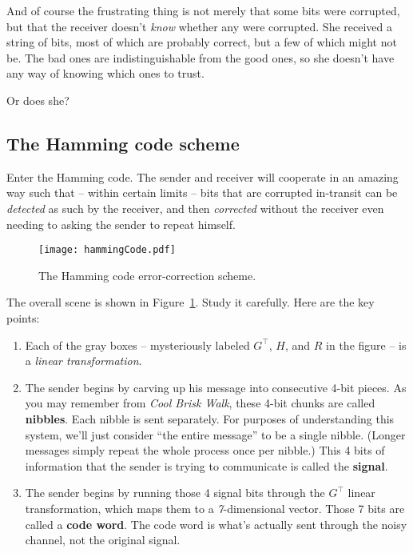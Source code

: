 \begin{alttitles}
And of course the frustrating thing is not merely that some bits were
corrupted, but that the receiver doesn't \textit{know} whether any were
corrupted. She received a string of bits, most of which are probably correct,
but a few of which might not be. The bad ones are indistinguishable from the
good ones, so she doesn't have any way of knowing which ones to trust.

Or does she?

\subsection{The Hamming code scheme}

Enter the Hamming code. The sender and receiver will cooperate in an amazing
way such that -- within certain limits -- bits that are corrupted in-transit
can be \textit{detected} as such by the receiver, and then \textit{corrected}
without the receiver even needing to asking the sender to repeat himself.

\begin{figure}[ht]
\centering
\texttt{[image: hammingCode.pdf]}
\vspace{-.4in}
\caption{The Hamming code error-correction scheme.}
\label{fig:hammingCode}
\end{figure}
\smallskip

The overall scene is shown in Figure~\ref{fig:hammingCode}. Study it carefully.
Here are the key points:

\begin{enumerate}

\item Each of the gray boxes -- mysteriously labeled $G^\intercal$, $H$, and $R$ in the
figure -- is a \textit{linear transformation}.

\item The sender begins by carving up his message into consecutive 4-bit pieces.
 As you may remember from \textit{Cool Brisk Walk}, these 4-bit chunks are
called \textbf{nibbles}. Each nibble is sent separately. For purposes of
understanding this system, we'll just consider ``the entire message'' to be a
single nibble. (Longer messages simply repeat the whole process once per
nibble.) This 4 bits of information that the sender is trying to communicate is
called the \textbf{signal}.

\item The sender begins by running those 4 signal bits through the
$G^\intercal$ linear transformation, which maps them to a
\textit{7}-dimensional vector. Those 7 bits are called a \textbf{code word}.
The code word is what's actually sent through the noisy channel, not the
original signal.


\end{enumerate}
\end{alttitles}
